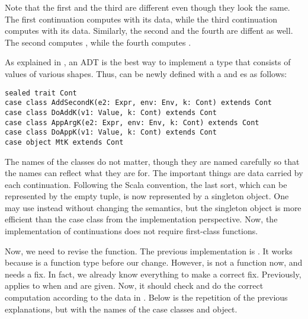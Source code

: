 Note that the first and the third are different even though they look the same.
The first continuation computes  with its data, while the third continuation computes
 with its data. Similarly, the
second and the fourth are diffent as well. The second computes , while the fourth computes .

As explained in , an ADT is the best way to implement a
type that consists of values of various shapes.
Thus,  can be newly defined with a  and es as follows:

\begin{verbatim}
sealed trait Cont
case class AddSecondK(e2: Expr, env: Env, k: Cont) extends Cont
case class DoAddK(v1: Value, k: Cont) extends Cont
case class AppArgK(e2: Expr, env: Env, k: Cont) extends Cont
case class DoAppK(v1: Value, k: Cont) extends Cont
case object MtK extends Cont
\end{verbatim}

The names of the classes do not matter, though they are named carefully so that
the names can reflect what they are for. The important things are data carried by
each continuation. Following the Scala convention, the last sort, which can be
represented by the empty tuple, is now represented by a singleton object. One
may use  instead without changing the semantics,
but the singleton object is more efficient than the case class from the
implementation perspective. Now, the implementation of continuations does not
require first-class functions.

Now, we need to revise the  function. The previous implementation
is . It works because
 is a function type before our change. However,  is not a
function now, and
 needs a fix. In fact, we already know everything to make a
correct fix. Previously,  applies  to  when 
and  are given. Now, it should check  and do the correct
computation according to the data in . Below is the repetition of the
previous explanations, but with the names of the case classes and object.

